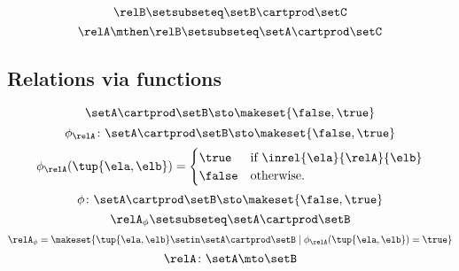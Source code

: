 \begin{forslides}
    \begin{equation}
        \label{eq:slides_session2_rel_108}
        \relB \setsubseteq \setB \cartprod \setC
    \end{equation}
    \begin{equation}
        \label{eq:slides_session2_rel_109}
        \relA \mthen \relB \setsubseteq \setA \cartprod \setC
    \end{equation}

    \subsection{Relations via functions}

    \begin{equation}
        \label{eq:slides_session2_rel_110}
        \setA \cartprod \setB \sto \makeset{ \false, \true }
    \end{equation}
    \begin{equation}
        \label{eq:slides_session2_rel_111}
        \phi_{\relA} \colon \setA \cartprod \setB \sto \makeset{ \false, \true }
    \end{equation}
    \begin{equation}
        \label{eq:slides_session2_rel_112}
        \phi_{\relA}(\tup{\ela, \elb}) =
        \begin{cases}
            \true  & \text{if } \inrel{\ela}{\relA}{\elb} \\
            \false & \text{otherwise.
            }
        \end{cases}
    \end{equation}
    \begin{equation}
        \label{eq:slides_session2_rel_113}
        \phi\colon \setA \cartprod \setB \sto \makeset{ \false, \true }
    \end{equation}
    \begin{equation}
        \label{eq:slides_session2_rel_114}
        \relA_{\phi} \setsubseteq \setA \cartprod \setB
    \end{equation}
    \begin{equation}
        \label{eq:slides_session2_rel_115}
        \relA_{\phi} = \makeset{ \tup{\ela, \elb} \setin \setA \cartprod \setB \mid \phi_{\relA}(\tup{\ela, \elb}) = \true }
    \end{equation}
    \begin{equation}
        \label{eq:slides_session2_rel_116}
        \relA \colon \setA \mto \setB
    \end{equation}

\end{forslides}
